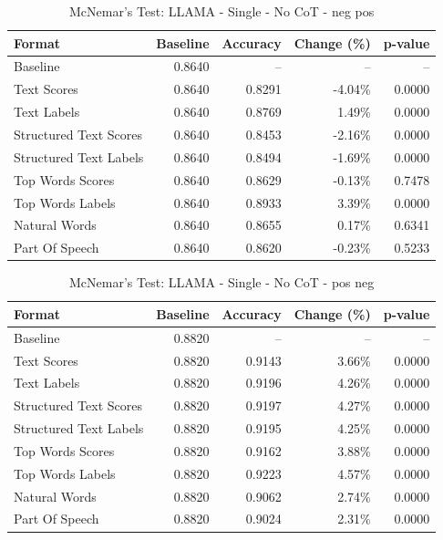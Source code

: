 \begin{table}[htbp]
\centering
\caption{McNemar's Test: LLAMA - Single - No CoT - neg pos}
\label{tab:llama-single-no_chain_of_thought-neg_pos}
\begin{tabular}{lrrrr}
\toprule
Format & Baseline & Accuracy & Change (\%) & p-value \\
\midrule
Baseline & 0.8640 & -- & -- & -- \\
Text Scores & 0.8640 & 0.8291 & -4.04\% & 0.0000 \\
Text Labels & 0.8640 & 0.8769 & 1.49\% & 0.0000 \\
Structured Text Scores & 0.8640 & 0.8453 & -2.16\% & 0.0000 \\
Structured Text Labels & 0.8640 & 0.8494 & -1.69\% & 0.0000 \\
Top Words Scores & 0.8640 & 0.8629 & -0.13\% & 0.7478 \\
Top Words Labels & 0.8640 & 0.8933 & 3.39\% & 0.0000 \\
Natural Words & 0.8640 & 0.8655 & 0.17\% & 0.6341 \\
Part Of Speech & 0.8640 & 0.8620 & -0.23\% & 0.5233 \\
\bottomrule
\end{tabular}
\end{table}

\begin{table}[htbp]
\centering
\caption{McNemar's Test: LLAMA - Single - No CoT - pos neg}
\label{tab:llama-single-no_chain_of_thought-pos_neg}
\begin{tabular}{lrrrr}
\toprule
Format & Baseline & Accuracy & Change (\%) & p-value \\
\midrule
Baseline & 0.8820 & -- & -- & -- \\
Text Scores & 0.8820 & 0.9143 & 3.66\% & 0.0000 \\
Text Labels & 0.8820 & 0.9196 & 4.26\% & 0.0000 \\
Structured Text Scores & 0.8820 & 0.9197 & 4.27\% & 0.0000 \\
Structured Text Labels & 0.8820 & 0.9195 & 4.25\% & 0.0000 \\
Top Words Scores & 0.8820 & 0.9162 & 3.88\% & 0.0000 \\
Top Words Labels & 0.8820 & 0.9223 & 4.57\% & 0.0000 \\
Natural Words & 0.8820 & 0.9062 & 2.74\% & 0.0000 \\
Part Of Speech & 0.8820 & 0.9024 & 2.31\% & 0.0000 \\
\bottomrule
\end{tabular}
\end{table}

